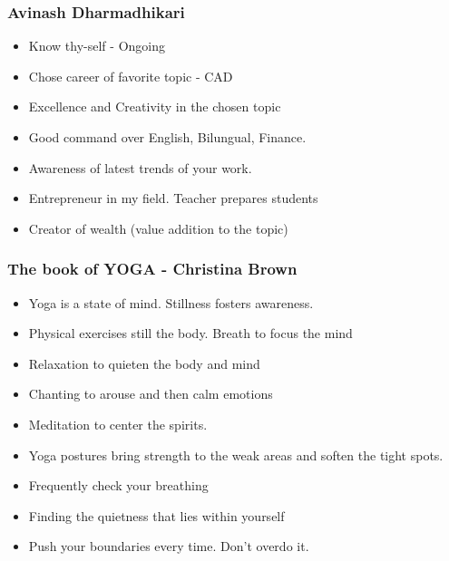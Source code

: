 \begin{frame}[fragile]\frametitle{Avinash Dharmadhikari}

	\begin{itemize}
	\item Know thy-self - Ongoing
	\item Chose career of favorite topic - CAD
	\item Excellence and Creativity in the chosen topic
	\item Good command over English, Bilungual, Finance.
	\item Awareness of latest trends of your work.
	\item Entrepreneur in my field.  Teacher prepares students
	\item Creator of wealth (value addition to the topic)  
	\end{itemize}

\end{frame}


\begin{frame}[fragile]\frametitle{The book of YOGA - Christina Brown}

	\begin{itemize}
	\item Yoga is a state of mind. Stillness fosters awareness.
	\item Physical exercises still the body. Breath to focus the mind
	\item Relaxation to quieten the body and mind
	\item Chanting to arouse and then calm emotions
	\item Meditation to center the spirits.
	\item Yoga postures bring strength to the weak areas and soften the tight spots.
	\item Frequently check your breathing
	\item Finding the quietness that lies within yourself
	\item Push your boundaries every time. Don't overdo it.
	\end{itemize}

\end{frame}


